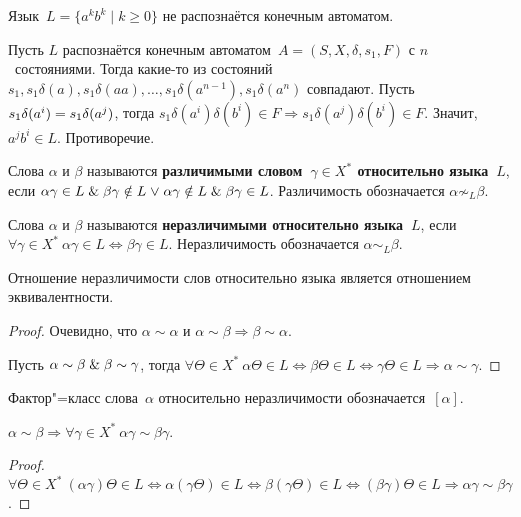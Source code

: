 \begin{theorem}
Язык~$L = \{ a^k b^k \mid k \geqslant 0 \}$ не распознаётся конечным автоматом.
\end{theorem}
\begin{proofcontra}
Пусть $L$ распознаётся конечным автоматом~$A = (S, X, \delta, s_1, F)$ с $n$~состояниями.
Тогда какие-то из состояний $s_1, s_1 \delta(a), s_1 \delta(aa), \ldots, s_1 \delta(a^{n-1}), s_1 \delta(a^n)$ совпадают.
Пусть $s_1 \delta(a^i) \opbr= s_1 \delta(a^j)$, тогда $s_1 \delta(a^i) \delta(b^i) \in F \Rightarrow
s_1 \delta(a^j) \delta(b^i) \in F$.
Значит, $a^j b^i \in L$.
Противоречие.
\end{proofcontra}

Слова $\alpha$ и $\beta$ называются \textbf{различимыми словом~$\gamma \in X^*$ относительно языка~$L$}, если $\alpha \gamma \in L \opbr\lAnd \beta \gamma \notin L \opbr\lOr \alpha \gamma \notin L \opbr\lAnd \beta \gamma \in L$.
Различимость обозначается $\alpha \not\sim_L \beta$.

Слова $\alpha$ и $\beta$ называются \textbf{неразличимыми относительно языка~$L$}, если $\forall \gamma \in X^* \ \alpha \gamma \in L \Leftrightarrow \beta \gamma \in L$.
Неразличимость обозначается $\alpha \sim_L \beta$.

\begin{statement}
Отношение неразличимости слов относительно языка является отношением эквивалентности.
\end{statement}
\begin{proof}
Очевидно, что $\alpha \sim \alpha$ и $\alpha \sim \beta \Rightarrow \beta \sim \alpha$.

Пусть $\alpha \sim \beta \mathrel{\&} \beta \sim \gamma$, тогда $\forall \Theta \in X^* \ 
\alpha \Theta \in L \Leftrightarrow
\beta \Theta \in L \Leftrightarrow
\gamma \Theta \in L \Rightarrow
\alpha \sim \gamma$.
\end{proof}

Фактор"=класс слова~$\alpha$ относительно неразличимости обозначается~$[\alpha]$.

\begin{statement}
$\alpha \sim \beta \Rightarrow \forall \gamma \in X^* \ \alpha \gamma \sim \beta \gamma$.
\end{statement}
\begin{proof}
$\forall \Theta \in X^* \ (\alpha \gamma) \Theta \in L \Leftrightarrow
\alpha (\gamma \Theta) \in L \Leftrightarrow
\beta (\gamma \Theta) \in L \Leftrightarrow
(\beta \gamma) \Theta \in L \Rightarrow
\alpha \gamma \sim \beta \gamma$.
\end{proof}

